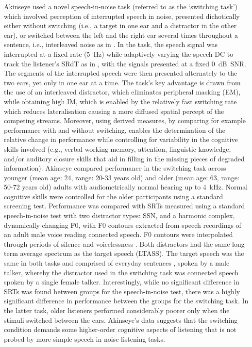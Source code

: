 \documentclass[a4paper, twoside]{templates/ociamthesis}
\begin{document}
Akinseye \autocite*[unpublished BSc thesis,][]{Akinseye2015} used a novel speech-in-noise task (referred to as the `switching task') which involved perception of interrupted speech in noise, presented dichotically either without switching (i.e., a target in one ear and a distractor in the other ear), or switched between the left and the right ear several times throughout a sentence, i.e., interleaved noise as in \textcite{Hoffman1978}. In the task, the speech signal was interrupted at a fixed rate (5~Hz) while adaptively varying the speech DC to track the listener's SRdT as in \textcite{Mair2013}, with the signals presented at a fixed 0~dB~SNR. The segments of the interrupted speech were then presented alternately to the two ears, yet only in one ear at a time. The task's key advantage is drawn from the use of an interleaved distractor, which eliminates peripheral masking (EM), while obtaining high IM, which is enabled by the relatively fast switching rate which reduces lateralisation causing a more diffused spatial percept of the competing streams. Moreover, using derived measures, by comparing for example performance with and without switching, enables the determination of the relative change in performance while controlling for variability in the cognitive skills involved (e.g., verbal working memory, attention, linguistic knowledge, and/or auditory closure skills that aid in filling in the missing pieces of degraded information). Akinseye compared performance in the switching task across younger (mean age: 24, range: 20-33 years old) and older (mean age: 63, range: 50-72 years old) adults with audiometrically normal hearing up to 4~kHz. Normal cognitive skills were controlled for the older participants using a standard screening test. Performance was compared with SRTs measured using a standard speech-in-noise test with two distractor types: SSN, and a harmonic complex, dynamically changing F0, with F0 contours extracted from speech recordings of an adult male voice reading connected speech. F0 contours were interpolated through periods of silence and voicelessness \autocite[for more details about the distractor see the Methods section or][]{Green2013}. Both distractors had the same long-term average spectrum as the target speech (LTASS). The target speech was the same in both tasks and comprised of everyday sentences \autocite[ASL;][]{MacLeod1990}, spoken by a male talker, whereby the distractor used in the switching task was connected speech spoken by a single female talker. Interestingly, while no significant difference in SRTs was found between groups for the speech-in-noise test, there was a highly significant difference in performance between the groups for the switching task. In the latter task, older listeners performed considerably poorer only when the stimuli switched between the ears. Akinseye's data suggests that the switching condition demands some higher-order cognitive aspects of listening that is not probed by more simple speech-in-noise listening tasks.\\
\end{document}
